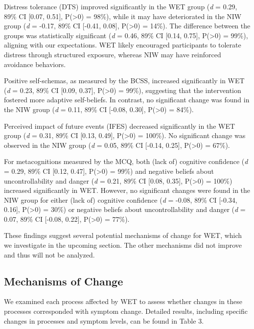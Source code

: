 \documentclass[
  man,floatsintext]{apa7}
\begin{document}
Distress tolerance (DTS) improved significantly in the WET group (\emph{d} = 0.29, 89\% CI {[}0.07, 0.51{]}, P(\textgreater0) = 98\%), while it may have deteriorated in the NIW group (\emph{d} = -0.17, 89\% CI {[}-0.41, 0.08{]}, P(\textgreater0) = 14\%).
The difference between the groups was statistically significant (\emph{d} = 0.46, 89\% CI {[}0.14, 0.75{]}, P(\textgreater0) = 99\%), aligning with our expectations.
WET likely encouraged participants to tolerate distress through structured exposure, whereas NIW may have reinforced avoidance behaviors.

Positive self-schemas, as measured by the BCSS, increased significantly in WET (\emph{d} = 0.23, 89\% CI {[}0.09, 0.37{]}, P(\textgreater0) = 99\%), suggesting that the intervention fostered more adaptive self-beliefs.
In contrast, no significant change was found in the NIW group (\emph{d} = 0.11, 89\% CI {[}-0.08, 0.30{]}, P(\textgreater0) = 84\%).

Perceived impact of future events (IFES) decreased significantly in the WET group (\emph{d} = 0.31, 89\% CI {[}0.13, 0.49{]}, P(\textgreater0) = 100\%).
No significant change was observed in the NIW group (\emph{d} = 0.05, 89\% CI {[}-0.14, 0.25{]}, P(\textgreater0) = 67\%).

For metacognitions measured by the MCQ, both (lack of) cognitive confidence (\emph{d} = 0.29, 89\% CI {[}0.12, 0.47{]}, P(\textgreater0) = 99\%) and negative beliefs about uncontrollability and danger (\emph{d} = 0.21, 89\% CI {[}0.08, 0.35{]}, P(\textgreater0) = 100\%) increased significantly in WET.
However, no significant changes were found in the NIW group for either (lack of) cognitive confidence (\emph{d} = -0.08, 89\% CI {[}-0.34, 0.16{]}, P(\textgreater0) = 30\%) or negative beliefs about uncontrollability and danger (\emph{d} = 0.07, 89\% CI {[}-0.08, 0.22{]}, P(\textgreater0) = 77\%).

These findings suggest several potential mechanisms of change for WET, which we investigate in the upcoming section.
The other mechanisms did not improve and thus will not be analyzed.

\subsection{Mechanisms of Change}\label{mechanisms-of-change}

We examined each process affected by WET to assess whether changes in these processes corresponded with symptom change.
Detailed results, including specific changes in processes and symptom levels, can be found in Table 3.
\end{document}

